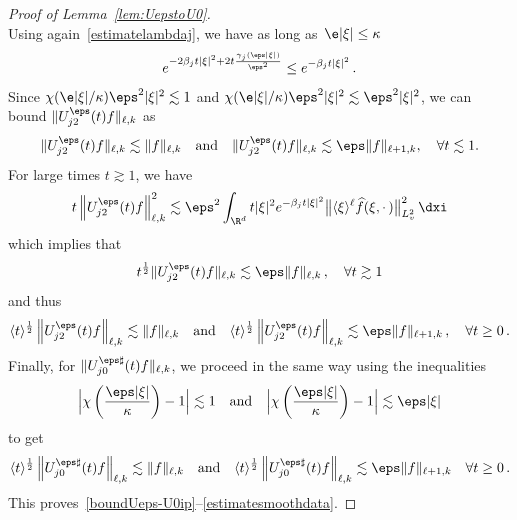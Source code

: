 \begin{proof}[Proof of Lemma~\ref{lem:UepstoU0}]
\[\]
Using again~\eqref{estimatelambdaj}, we have as long as~$\e|\xi|\leq \kappa$
\[
e^{- 2\beta_j t |\xi|^2+ 2t \frac{\gamma_j(\eps|\xi|)}{\eps^2}} \le e^{-\beta_j t |\xi|^2}\,.
\]
Since $\chi(\e|\xi|/\kappa) \eps^2|\xi|^2 \lesssim 1$ and $\chi(\e|\xi|/\kappa) \eps^2|\xi|^2 \lesssim \eps^2|\xi|^2$, we can bound $\|U^\eps_{j2} (t)f\|_{\ell,k}$ as
\[
\|U^\eps_{j2}(t)f\|_{\ell,k} \lesssim \|f\|_{\ell,k} \quad \text{and} \quad \|U^\eps_{j2}(t)f\|_{\ell,k} \lesssim \eps \|f\|_{\ell+1,k},\quad \forall t \lesssim 1.
\]
For large times $t \gtrsim 1$, we have
\[
t \left\|U^\eps_{j2}(t)f\right\|^2_{\ell,k} \lesssim
\eps^2 \int_{\R^d} t|\xi|^2 e^{-\beta_j t|\xi|^2} \big\| \langle \xi \rangle^{\ell}\widehat{f}(\xi,\cdot\,)\big\|^2_{L^2_v} \, \dxi
\]
which implies that
\[
t^\frac12 \|U^\eps_{j2}(t)f\|_{\ell,k}\lesssim \eps \|f\|_{\ell,k} \,, \quad \forall t \gtrsim 1
\]
and thus
\[
\langle t \rangle^{\frac 12} \left\|U^\eps_{j2}(t)f\right\|_{{\ell,k}} \lesssim \|f\|_{\ell,k} \quad \text{and} \quad \langle t \rangle^\frac12 \left\|U^\eps_{j2}(t)f \right\|_{\ell,k} \lesssim \eps \|f\|_{\ell+1,k} \,, \quad \forall t \ge 0 \,.
\]
Finally, for $\|U^{\eps\sharp}_{j0} (t) f\|_{\ell,k}$, we proceed in the same way using the inequalities
\begin{equation}\label{estimatechi}
\Big|\chi\left(\frac{\eps|\xi|}\kappa\right)-1\Big| \lesssim 1 \quad \text{and} \quad \Big|\chi\left(\frac{\eps|\xi|}\kappa\right)-1\Big| \lesssim \eps |\xi|
\end{equation}
to get
\[
\langle t \rangle^{\frac12} \left\| U^{\eps\sharp}_{j0} (t)f \right\|_{{\ell,k}} \lesssim \|f\|_{\ell,k} \quad \text{and} \quad \langle t \rangle^{\frac12} \left\| U^{\eps\sharp}_{j0} (t)f \right\|_{{\ell,k}} \lesssim\eps \|f\|_{\ell+1,k}\quad \forall t \ge 0 \,.
\]
This proves~\eqref{boundUeps-U0ip}--\eqref{estimatesmoothdata}.



\end{proof}
